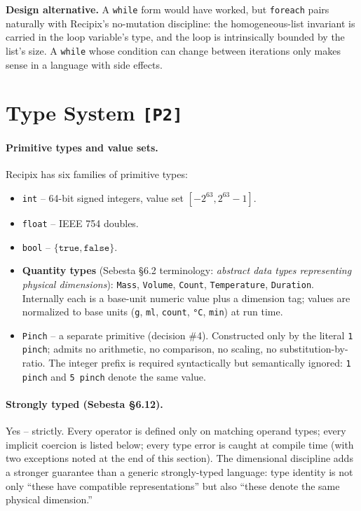 \documentclass[11pt,a4paper]{article}
\begin{document}
\medskip
\noindent\textbf{Design alternative.} A \texttt{while} form would have
worked, but \texttt{foreach} pairs naturally with Recipix's
no-mutation discipline: the homogeneous-list invariant is carried in
the loop variable's type, and the loop is intrinsically bounded by
the list's size. A \texttt{while} whose condition can change between
iterations only makes sense in a language with side effects.


\section{Type System \texttt{[P2]}}

\paragraph{Primitive types and value sets.}
Recipix has six families of primitive types:
\begin{itemize}[leftmargin=*,itemsep=2pt]
  \item \texttt{int} -- 64-bit signed integers, value set $[-2^{63}, 2^{63}{-}1]$.
  \item \texttt{float} -- IEEE 754 doubles.
  \item \texttt{bool} -- $\{\texttt{true}, \texttt{false}\}$.
  \item \textbf{Quantity types} (Sebesta \S6.2 terminology: \emph{abstract
        data types representing physical dimensions}): \texttt{Mass},
        \texttt{Volume}, \texttt{Count}, \texttt{Temperature},
        \texttt{Duration}. Internally each is a base-unit numeric value
        plus a dimension tag; values are normalized to base units
        (\texttt{g}, \texttt{ml}, \texttt{count}, \texttt{°C},
        \texttt{min}) at run time.
  \item \texttt{Pinch} -- a separate primitive (decision \#4). Constructed
        only by the literal \texttt{1 pinch}; admits no arithmetic, no
        comparison, no scaling, no substitution-by-ratio. The integer
        prefix is required syntactically but semantically ignored:
        \texttt{1 pinch} and \texttt{5 pinch} denote the same value.
\end{itemize}

\paragraph{Strongly typed (Sebesta \S6.12).} Yes -- strictly. Every operator
is defined only on matching operand types; every implicit coercion is
listed below; every type error is caught at compile time (with two
exceptions noted at the end of this section). The dimensional discipline
adds a stronger guarantee than a generic strongly-typed language: type
identity is not only ``these have compatible representations'' but also
``these denote the same physical dimension.''
\end{document}
